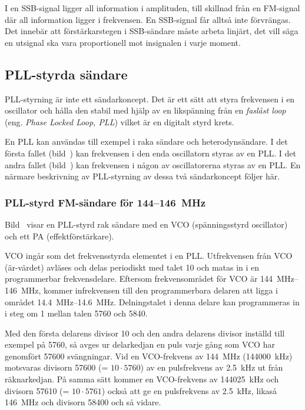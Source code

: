 I en SSB-signal ligger all information i amplituden, till skillnad
från en FM-signal där all information ligger i frekvensen.
En SSB-signal får alltså inte förvrängas.
Det innebär att förstärkarstegen i SSB-sändare måste arbeta linjärt, det vill
säga en utsignal ska vara proportionell mot insignalen i varje moment.

\subsection{PLL-styrda sändare}

PLL-styrning är inte ett sändarkoncept.
Det är ett sätt att styra frekvensen i en oscillator och hålla den stabil med
hjälp av en likspänning från en \emph{faslåst loop} (eng.
\emph{Phase Locked Loop, PLL}) vilket är en digitalt styrd krets.

En PLL kan användas till exempel i raka sändare och heterodynsändare.
I det första fallet (bild~) kan frekvensen i den enda
oscillatorn styras av en PLL.
I det andra fallet (bild~) kan frekvensen i
någon av oscillatorerna styras av en PLL.
En närmare beskrivning av PLL-styrning av dessa två sändarkoncept följer här.

\subsubsection{PLL-styrd FM-sändare för 144--146~MHz}


Bild~ visar en PLL-styrd rak sändare med en VCO
(spänningsstyrd oscillator) och ett PA (effektförstärkare).

VCO ingår som det frekvensstyrda elementet i en PLL.
Utfrekvensen från VCO (är-värdet) avläses och delas periodiskt med talet 10
och matas in i en programmerbar frekvensdelare.
Eftersom frekvensområdet för VCO är \SIrange{144}{146}{\mega\hertz}, kommer
infrekvensen till den programmerbara delaren att ligga i området
\SIrange{14,4}{14,6}{\mega\hertz}.
Delningstalet i denna delare kan programmeras in i steg om 1 mellan
talen 5760 och 5840.

Med den första delarens divisor 10 och den andra delarens divisor
inställd till exempel på 5760, så avges ur delarkedjan en puls varje gång som
VCO har genomfört 57600 svängningar.
Vid en VCO-frekvens av \qty{144}{\mega\hertz} (\qty{144000}{\kilo\hertz}) motsvaras
divisorn 57600 (= \(10 \cdot 5760\)) av en pulsfrekvens av \qty{2,5}{\kilo\hertz}
ut från räknarkedjan.
På samma sätt kommer en VCO-frekvens av \qty{144025}{\kilo\hertz} och divisorn
57610 (= \(10 \cdot 5761\)) också att ge en pulsfrekvens av
\qty{2,5}{\kilo\hertz}, likaså \qty{146}{\mega\hertz} och divisorn 58400 och så
vidare.

